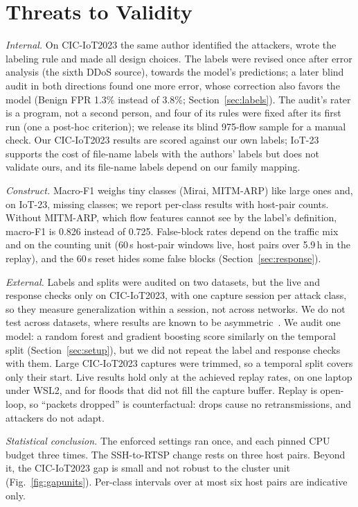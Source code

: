 \section{Threats to Validity}\label{sec:threats}

\emph{Internal.} On CIC-IoT2023 the same author identified the attackers, wrote the labeling rule and made all design choices. The labels were revised once after error analysis (the sixth DDoS source), towards the model's predictions; a later blind audit in both directions found one more error, whose correction also favors the model (Benign FPR 1.3\% instead of 3.8\%; Section~\ref{sec:labels}). The audit's rater is a program, not a second person, and four of its rules were fixed after its first run (one a post-hoc criterion); we release its blind 975-flow sample for a manual check. Our CIC-IoT2023 results are scored against our own labels; IoT-23 supports the cost of file-name labels with the authors' labels but does not validate ours, and its file-name labels depend on our family mapping.

\emph{Construct.} Macro-F1 weighs tiny classes (Mirai, MITM-ARP) like large ones and, on IoT-23, missing classes; we report per-class results with host-pair counts. Without MITM-ARP, which flow features cannot see by the label's definition, macro-F1 is 0.826 instead of 0.725. False-block rates depend on the traffic mix and on the counting unit (60\,s host-pair windows live, host pairs over 5.9\,h in the replay), and the 60\,s reset hides some false blocks (Section~\ref{sec:response}).

\emph{External.} Labels and splits were audited on two datasets, but the live and response checks only on CIC-IoT2023, with one capture session per attack class, so they measure generalization within a session, not across networks. We do not test across datasets, where results are known to be asymmetric~\cite{ali2026siamxbert}. We audit one model: a random forest and gradient boosting score similarly on the temporal split (Section~\ref{sec:setup}), but we did not repeat the label and response checks with them. Large CIC-IoT2023 captures were trimmed, so a temporal split covers only their start. Live results hold only at the achieved replay rates, on one laptop under WSL2, and for floods that did not fill the capture buffer. Replay is open-loop, so ``packets dropped'' is counterfactual: drops cause no retransmissions, and attackers do not adapt.

\emph{Statistical conclusion.} The enforced settings ran once, and each pinned CPU budget three times. The SSH-to-RTSP change rests on three host pairs. Beyond it, the CIC-IoT2023 gap is small and not robust to the cluster unit (Fig.~\ref{fig:gapunits}). Per-class intervals over at most six host pairs are indicative only.

